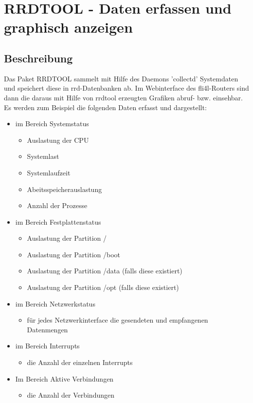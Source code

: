 \section {RRDTOOL - Daten erfassen und graphisch anzeigen}

\subsection {Beschreibung}
Das Paket RRDTOOL sammelt mit Hilfe des Daemons 'collectd' Systemdaten und 
speichert diese in rrd-Datenbanken ab.
Im Webinterface des fli4l-Routers sind dann die daraus mit Hilfe von rrdtool 
erzeugten Grafiken abruf- bzw. einsehbar.
\\
Es werden zum Beispiel die folgenden Daten erfasst und dargestellt:
 \begin{itemize}
  \item im Bereich Systemstatus
  \begin{itemize}
   \item Auslastung der CPU
   \item Systemlast
   \item Systemlaufzeit
   \item Abeitsspeicherauslastung
   \item Anzahl der Prozesse
  \end{itemize}
  \item im Bereich Festplattenstatus
   \begin{itemize}
   \item Auslastung der Partition /
   \item Auslastung der Partition /boot
   \item Auslastung der Partition /data (falls diese existiert)
   \item Auslastung der Partition /opt (falls diese existiert)
  \end{itemize}
  \item im Bereich Netzwerkstatus
  \begin{itemize}
   \item für jedes Netzwerkinterface die gesendeten und empfangenen Datenmengen
  \end{itemize}
  \item im Bereich Interrupts
  \begin{itemize}
   \item die Anzahl der einzelnen Interrupts
  \end{itemize}
  \item Im Bereich Aktive Verbindungen
  \begin{itemize}
   \item die Anzahl der Verbindungen
  \end{itemize}
 \end{itemize} 
 
